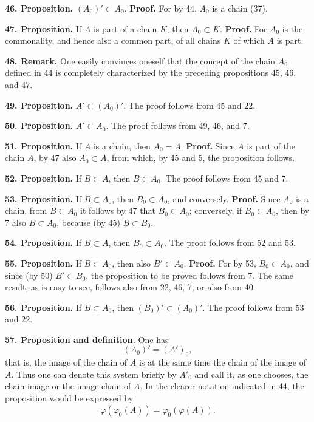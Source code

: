 \documentclass[11pt]{article}
\newcommand{\partof}{\mathrel{\subset}}
\begin{document}
\noindent\textbf{46. Proposition.} $(A_0)'\partof A_0$. \textbf{Proof.} For by 44, $A_0$ is a chain (37).

\noindent\textbf{47. Proposition.} If $A$ is part of a chain $K$, then $A_0\partof K$. \textbf{Proof.} For $A_0$ is the commonality, and hence also a common part, of all chains $K$ of which $A$ is part.

\noindent\textbf{48. Remark.} One easily convinces oneself that the concept of the chain $A_0$ defined in 44 is completely characterized by the preceding propositions 45, 46, and 47.

\noindent\textbf{49. Proposition.} $A'\partof(A_0)'$. The proof follows from 45 and 22.

\noindent\textbf{50. Proposition.} $A'\partof A_0$. The proof follows from 49, 46, and 7.

\noindent\textbf{51. Proposition.} If $A$ is a chain, then $A_0=A$. \textbf{Proof.} Since $A$ is part of the chain $A$, by 47 also $A_0\partof A$, from which, by 45 and 5, the proposition follows.

\noindent\textbf{52. Proposition.} If $B\partof A$, then $B\partof A_0$. The proof follows from 45 and 7.

\noindent\textbf{53. Proposition.} If $B\partof A_0$, then $B_0\partof A_0$, and conversely. \textbf{Proof.} Since $A_0$ is a chain, from $B\partof A_0$ it follows by 47 that $B_0\partof A_0$; conversely, if $B_0\partof A_0$, then by 7 also $B\partof A_0$, because (by 45) $B\partof B_0$.

\noindent\textbf{54. Proposition.} If $B\partof A$, then $B_0\partof A_0$. The proof follows from 52 and 53.

\noindent\textbf{55. Proposition.} If $B\partof A_0$, then also $B'\partof A_0$. \textbf{Proof.} For by 53, $B_0\partof A_0$, and since (by 50) $B'\partof B_0$, the proposition to be proved follows from 7. The same result, as is easy to see, follows also from 22, 46, 7, or also from 40.

\noindent\textbf{56. Proposition.} If $B\partof A_0$, then $(B_0)'\partof(A_0)'$. The proof follows from 53 and 22.

\noindent\textbf{57. Proposition and definition.} One has
\[
(A_0)'=(A')_0,
\]
that is, the image of the chain of $A$ is at the same time the chain of the image of $A$. Thus one can denote this system briefly by $A'_0$ and call it, as one chooses, the chain-image or the image-chain of $A$. In the clearer notation indicated in 44, the proposition would be expressed by
\[
\varphi(\varphi_0(A))=\varphi_0(\varphi(A)).
\]
\end{document}
